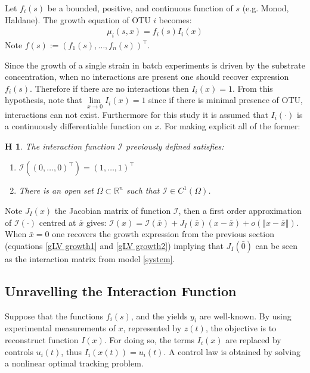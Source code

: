 \documentclass[3p,times]{article}
\newcommand{\R}{\mathbb{R}}
\newcommand{\I}{\mathcal{I}}
\newtheorem{hypo}{H}
\begin{document}
Let $f_i(s)$ be a bounded, positive, and continuous function of $s$ (e.g. Monod, Haldane). The growth equation of OTU $i$ becomes:
\begin{align}
	\mu_i(s,x) = f_i(s)I_i(x)
\end{align}
Note $f(s) := (f_1(s),\dots,f_n(s))^\top$.
	\label{growthForm}

Since the growth of a single strain in batch experiments is driven by the substrate concentration, when no interactions are present one should recover expression $f_i(s)$. Therefore if there are no interactions then $I_i(x) = 1$. From this hypothesis, note that $ \lim \limits_{x \rightarrow 0} I_i(x) = 1$ since if there is minimal presence of OTU, interactions can not exist. Furthermore for this study it is assumed that $I_i(\cdot)$ is a continuously differentiable function on $x$. For making explicit all of the former:

\begin{hypo}
	The interaction function $\I$ previously defined satisfies:
	\begin{enumerate}
		\item $	\I \left( (0,\dots,0)^\top \right) = (1,\dots,1)^\top $
		\item There is an open set $\Omega \subset \R^n $ such that $\I \in C^1(\Omega)$.
	\end{enumerate} 
\end{hypo}


Note $J_I(x)$ the Jacobian matrix of function $\mathcal{I}$, then a first order approximation of $\I(\cdot)$ centred at $\bar{x}$ gives: $\I(x) = \I(\bar{x}) + J_I(\bar{x})(x-\bar{x}) + o(\Vert x- \bar{x} \Vert)$. When $\bar{x}= 0$ one recovers the growth expression from the previous section (equations \eqref{gLV growth1} and \eqref{gLV growth2}) implying that $J_I(\bar{0})$ can be seen as the interaction matrix from model \eqref{system}.

\subsection{Unravelling the Interaction Function}

Suppose that the functions $f_i(s)$, and the yields $y_i$ are well-known. By using experimental measurements of $x$, represented by $z(t)$, the objective is to reconstruct function $I(x)$. For doing so, the terms $I_i(x)$ are replaced by controls $u_i(t)$, thus $I_i(x(t)) = u_i(t)$. A control law is obtained by solving a nonlinear optimal tracking problem.	
\end{document}
